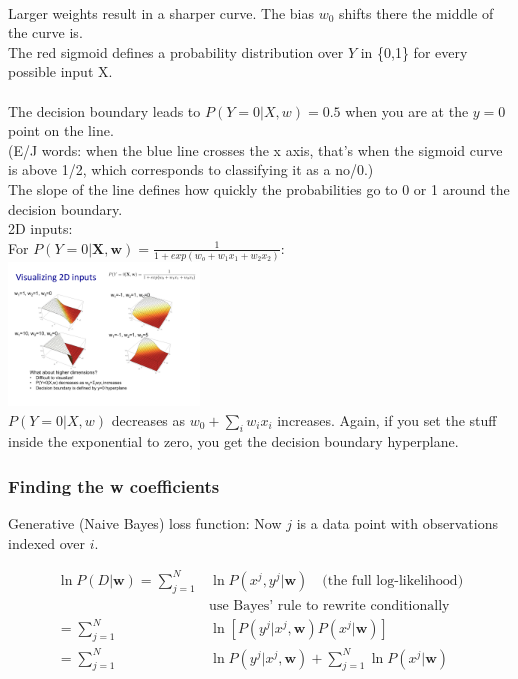 \hfill \\
Larger weights result in a sharper curve.  The bias $w_0$ shifts there the middle of the curve is.   \hfill \\
The red sigmoid defines a probability distribution over $Y$ in \{0,1\} for every possible input X. \hfill \\
\hfill \\
The decision boundary leads to $P(Y=0|X, w) = 0.5$ when you are at the $y=0$ point on the line.   \hfill \\
(E/J words:  when the blue line crosses the x axis, that's when the sigmoid curve is above 1/2, which corresponds to classifying it as a no/0.)  \hfill \\
The slope of the line defines how quickly the probabilities go to 0 or 1 around the decision boundary. 
\hfill \\

2D inputs: \hfill \\
For $ \displaystyle P(Y=0 | \bm{X,w}) = \frac{1}{1 + exp(w_o + w_1 x_1 + w_2 x_2)}$:  \hfill \\
\includegraphics[width=2in]{figures/decision_boundary_example-2D.pdf}   \hfill \\

$P(Y=0 | X, w)$ decreases as $w_0 + \sum_i w_i x_i$ increases. 
Again, if you set the stuff inside the exponential to zero, you get the decision boundary hyperplane.

\subsubsection{Finding the w coefficients}
Generative (Naive Bayes) loss function: 
Now $j$ is a data point with observations indexed over $i$.


\begin{align*}
	\ln P(D | \bm{w}) = \sum_{j=1}^N  &  \ln P(x^j, y^j | \bm{w}) \mbox{   } \mbox{    (the full log-likelihood)}\\
					& \mbox{use Bayes' rule to rewrite conditionally}  \\  %
					= \sum_{j=1}^N  &  \ln [P(y^j | x^j, \bm{w}) P(x^j | \bm{w})] \\ %
				=  \sum_{j=1}^N  & \ln P(y^j | x^j , \bm{w}) + \sum_{j=1}^N \ln P(x^j | \bm{w})
\end{align*}

